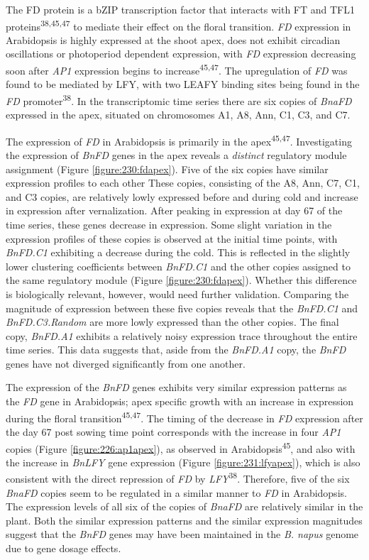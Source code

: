 \documentclass[12pt,]{book}
\begin{document}
The FD protein is a bZIP transcription factor that interacts with FT and
TFL1 proteins\textsuperscript{38,45,47} to mediate their effect on the
floral transition. \emph{FD} expression in Arabidopsis is highly
expressed at the shoot apex, does not exhibit circadian oscillations or
photoperiod dependent expression, with \emph{FD} expression decreasing
soon after \emph{AP1} expression begins to
increase\textsuperscript{45,47}. The upregulation of \emph{FD} was found
to be mediated by LFY, with two LEAFY binding sites being found in the
\emph{FD} promoter\textsuperscript{38}. In the transcriptomic time
series there are six copies of \emph{BnaFD} expressed in the apex,
situated on chromosomes A1, A8, Ann, C1, C3, and C7.

The expression of \emph{FD} in Arabidopsis is primarily in the
apex\textsuperscript{45,47}. Investigating the expression of \emph{BnFD}
genes in the apex reveals a \emph{distinct} regulatory module assignment
(Figure \ref{figure:230:fdapex}). Five of the six copies have similar
expression profiles to each other These copies, consisting of the A8,
Ann, C7, C1, and C3 copies, are relatively lowly expressed before and
during cold and increase in expression after vernalization. After
peaking in expression at day 67 of the time series, these genes decrease
in expression. Some slight variation in the expression profiles of these
copies is observed at the initial time points, with \emph{BnFD.C1}
exhibiting a decrease during the cold. This is reflected in the slightly
lower clustering coefficients between \emph{BnFD.C1} and the other
copies assigned to the same regulatory module (Figure
\ref{figure:230:fdapex}). Whether this difference is biologically
relevant, however, would need further validation. Comparing the
magnitude of expression between these five copies reveals that the
\emph{BnFD.C1} and \emph{BnFD.C3.Random} are more lowly expressed than
the other copies. The final copy, \emph{BnFD.A1} exhibits a relatively
noisy expression trace throughout the entire time series. This data
suggests that, aside from the \emph{BnFD.A1} copy, the \emph{BnFD} genes
have not diverged significantly from one another.

The expression of the \emph{BnFD} genes exhibits very similar expression
patterns as the \emph{FD} gene in Arabidopsis; apex specific growth with
an increase in expression during the floral
transition\textsuperscript{45,47}. The timing of the decrease in
\emph{FD} expression after the day 67 post sowing time point corresponds
with the increase in four \emph{AP1} copies (Figure
\ref{figure:226:ap1apex}), as observed in
Arabidopsis\textsuperscript{45}, and also with the increase in
\emph{BnLFY} gene expression (Figure \ref{figure:231:lfyapex}), which is
also consistent with the direct repression of \emph{FD} by
\emph{LFY}\textsuperscript{38}. Therefore, five of the six \emph{BnaFD}
copies seem to be regulated in a similar manner to \emph{FD} in
Arabidopsis. The expression levels of all six of the copies of
\emph{BnaFD} are relatively similar in the plant. Both the similar
expression patterns and the similar expression magnitudes suggest that
the \emph{BnFD} genes may have been maintained in the \emph{B. napus}
genome due to gene dosage effects.
\end{document}
